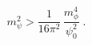 \begin{equation}
\label{eq:masscor3}
m_{\psi}^2 > \frac{1}{16\pi^2}\, \frac{m_{\phi}^4}{\psi_0^2} \;.
\end{equation}

